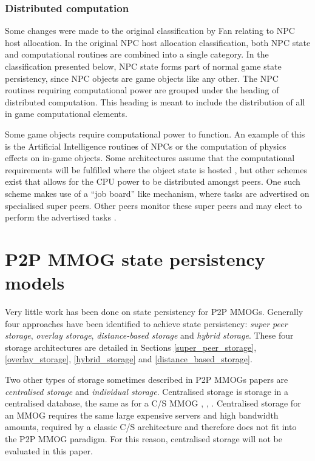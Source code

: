 \documentclass[10pt,a4paper,journal,cspaper,compsoc]{IEEEtran}
\begin{document}
\subsubsection{Distributed computation}

Some changes were made to the original classification by Fan relating to NPC host allocation. In the original NPC host allocation classification,
both NPC state and computational routines are combined into a single category. In the classification presented below, NPC state forms part of normal
game state persistency, since NPC objects are game objects like any other. The NPC routines requiring computational power are grouped under the
heading of distributed computation. This heading is meant to include the distribution of all in game computational elements.

Some game objects require computational power to function. An example of this is the Artificial Intelligence routines of \acp{NPC} or the computation
of physics effects on in-game objects. Some architectures assume that the computational requirements will be fulfilled where the object state is
hosted \cite{solipsis}, but other schemes exist that allows for the CPU power to be distributed amongst peers. One such scheme makes use of a ``job
board'' like mechanism, where tasks are advertised on specialised super peers. Other peers monitor these super peers and may elect to perform the
advertised tasks \cite{fan_mediator_paper}.


\section{P2P MMOG state persistency models}
\label{p2p_mmog_cm_overview}

Very little work has been done on state persistency for P2P MMOGs. Generally four approaches have been identified to achieve state persistency:
\emph{super peer storage}, \emph{overlay storage}, \emph{distance-based storage} and \emph{hybrid storage}. These four storage architectures are
detailed in Sections \ref{super_peer_storage}, \ref{overlay_storage}, \ref{hybrid_storage} and \ref{distance_based_storage}.

Two other types of storage sometimes described in P2P MMOGs papers are \emph{centralised storage} and \emph{individual storage}. Centralised storage
is storage in a centralised database, the same as for a C/S MMOG \cite{badumna_engine}, \cite{rooney_centralised_storage},
\cite{hybrid_p2p_cs_centralised}. Centralised storage for an MMOG requires the same large expensive servers and high bandwidth amounts, required by a
classic C/S architecture and therefore does not fit into the P2P MMOG paradigm. For this reason, centralised storage will not be evaluated in this
paper.
\end{document}
